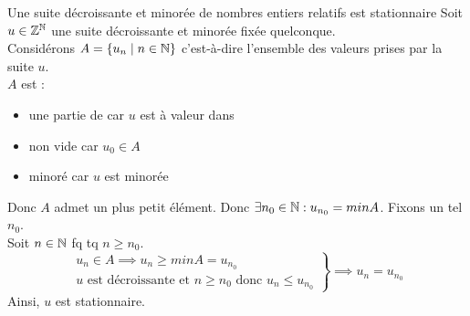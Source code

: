 \documentclass{article}
\begin{document}
	\begin{question_kholle}{Une suite décroissante et minorée de nombres entiers relatifs est stationnaire}
		Soit $u \in \mathbb Z^{\mathbb N}$ une suite décroissante et minorée fixée quelconque. \\
		Considérons $A = \{ u_n \;|\; n \in \mathbb N \}$ c'est-à-dire l'ensemble des valeurs prises par la suite $u$. \\
		$A$ est : \begin{itemize}[label=\textemdash]
			\item une partie de \Z car $u$ est à valeur dans \Z
			\item non vide car $u_0 \in A$
			\item minoré car $u$ est minorée
		\end{itemize}
		Donc $A$ admet un plus petit élément. Donc $\exists n_0 \in \mathbb N: u_{n_0} = min A$. Fixons un tel $n_0$. \\
		Soit $n \in \mathbb N$ fq tq $n \geqslant n_0$.
		\begin{equation*}
			\left. \begin{matrix}
				u_n \in A \implies u_n \geqslant min A = u_{n_0} \\
				 u \text{ est décroissante et } n \geqslant n_0 \text{ donc } u_n \leqslant u_{n_0}
			\end{matrix}
			\right\} \implies u_n = u_{n_0}
		\end{equation*}
  		Ainsi, $u$ est stationnaire.
	\end{question_kholle}
\end{document}
